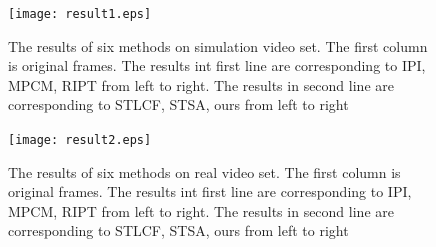 \documentclass[journal]{IEEEtran}
\begin{document}
\newenvironment{figurehere}
{\def\@captype{figure}}
{}

\begin{figure}
  \centering
  \texttt{[image: result1.eps]}
  \caption{The results of six methods on simulation video set. The first column is original frames. The results int first line are corresponding to IPI, MPCM, RIPT from left to right. The results in second line are corresponding to STLCF, STSA, ours from left to right}
  \label{result1}
\end{figure}

\begin{figure}
  \centering
  \texttt{[image: result2.eps]}
  \caption{The results of six methods on real video set. The first column is original frames. The results int first line are corresponding to IPI, MPCM, RIPT from left to right. The results in second line are corresponding to STLCF, STSA, ours from left to right}
  \label{result2}
\end{figure}
\end{document}
